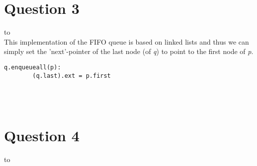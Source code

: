 \documentclass[a4paper]{article}
\def\headline#1{\hbox to \hsize{\hrulefill\quad\lower.3em\hbox{#1}\quad\hrulefill}}
\begin{document}
\section*{Question 3}
\headline{-} \ \\
This implementation of the FIFO queue is based on linked lists and thus we can simply set the 
'next'-pointer of the last node (of \textit{q}) to point to the first node of \textit{p}.
 \\

\noindent

\begin{lstlisting}[escapeinside={{*}{*}}]
    q.enqueueall(p):
        (q.last).ext = p.first
\end{lstlisting}
 
\ \\

\ \\
\section*{Question 4}
\headline{-} \ \\
\end{document}
